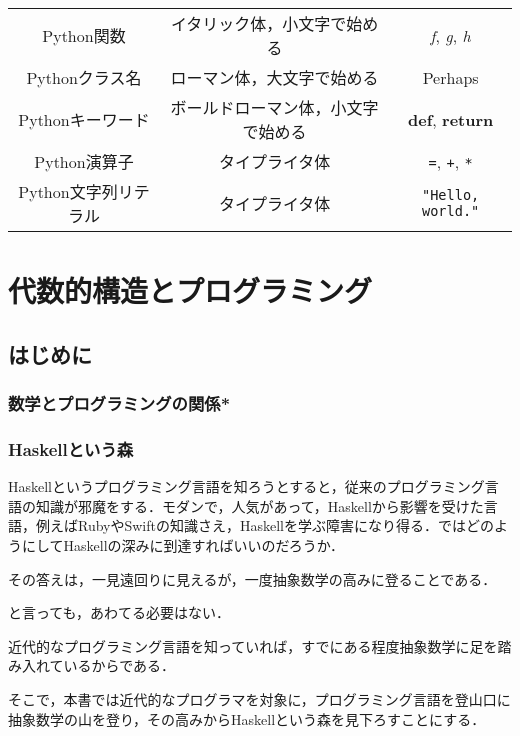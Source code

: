 \documentclass[twocolumn]{jsbook}
\newcommand{\pthnId}[1]{\textit{#1}}
\newcommand{\pthnKeyword}[1]{\textbf{#1}}
\newcommand{\pthnOp}[1]{\texttt{#1}}
\newcommand{\pthnString}[1]{\texttt{#1}}
\begin{document}
\begin{table*}
\begin{center}
\begin{tabular}{||c|c|c||}
Python関数&イタリック体，小文字で始める&\pthnId{f}, \pthnId{g}, \pthnId{h}\\
Pythonクラス名&ローマン体，大文字で始める&Perhaps\\
Pythonキーワード&ボールドローマン体，小文字で始める&\pthnKeyword{def}, \pthnKeyword{return}\\
Python演算子&タイプライタ体&\pthnOp{=}, \pthnOp{+}, \pthnOp{*}\\
Python文字列リテラル&タイプライタ体&\pthnString{"Hello, world."}\\
\hline
\end{tabular}
\end{center}
\end{table*}

\part{代数的構造とプログラミング}

\chapter{はじめに}

\section{数学とプログラミングの関係*}



\section{Haskellという森}

Haskellというプログラミング言語を知ろうとすると，従来のプログラミング言語の知識が邪魔をする．モダンで，人気があって，Haskellから影響を受けた言語，例えばRubyやSwiftの知識さえ，Haskellを学ぶ障害になり得る．ではどのようにしてHaskellの深みに到達すればいいのだろうか．

その答えは，一見遠回りに見えるが，一度抽象数学の高みに登ることである．

と言っても，あわてる必要はない．

近代的なプログラミング言語を知っていれば，すでにある程度抽象数学に足を踏み入れているからである．

そこで，本書では近代的なプログラマを対象に，プログラミング言語を登山口に抽象数学の山を登り，その高みからHaskellという森を見下ろすことにする．
\end{document}
